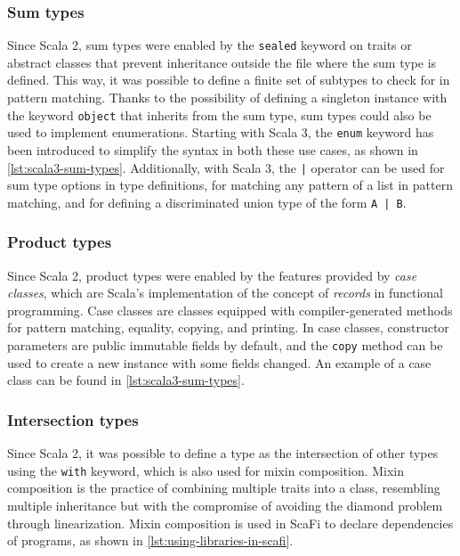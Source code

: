 \subsubsection{Sum types}

Since Scala 2, sum types were enabled by the \texttt{sealed} keyword on traits or abstract classes that prevent inheritance outside the file where the sum type is defined.
%
This way, it was possible to define a finite set of subtypes to check for in pattern matching.
%
Thanks to the possibility of defining a singleton instance with the keyword \texttt{object} that inherits from the sum type, sum types could also be used to implement enumerations.
%
Starting with Scala 3, the \texttt{enum} keyword has been introduced to simplify the syntax in both these use cases, as shown in \cref{lst:scala3-sum-types}.
%
Additionally, with Scala 3, the \texttt{|} operator can be used for sum type options in type definitions, for matching any pattern of a list in pattern matching, and for defining a discriminated union type of the form \texttt{A | B}.



\subsubsection{Product types}

Since Scala 2, product types were enabled by the features provided by \textit{case classes}, which are Scala's implementation of the concept of \textit{records} in functional programming.
%
Case classes are classes equipped with compiler-generated methods for pattern matching, equality, copying, and printing.
%
In case classes, constructor parameters are public immutable fields by default, and the \texttt{copy} method can be used to create a new instance with some fields changed.
%
An example of a case class can be found in \cref{lst:scala3-sum-types}.

\subsubsection{Intersection types}

Since Scala 2, it was possible to define a type as the intersection of other types using the \texttt{with} keyword, which is also used for mixin composition.
%
Mixin composition is the practice of combining multiple traits into a class, resembling multiple inheritance but with the compromise of avoiding the diamond problem through linearization\cite{scala-patterns}.
%
Mixin composition is used in ScaFi to declare dependencies of programs, as shown in \cref{lst:using-libraries-in-scafi}.

